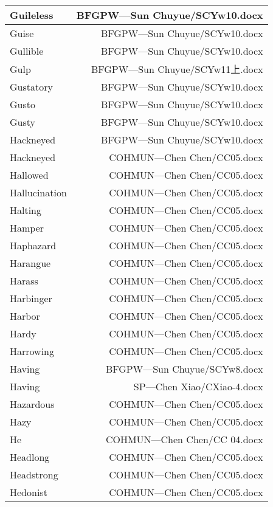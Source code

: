 \documentclass{article}
\begin{document}
\begin{center}
\begin{longtable}{|l|r|}
\hline
Guileless  &  BFGPW---Sun Chuyue/SCYw10.docx\\  
\hline
Guise  &  BFGPW---Sun Chuyue/SCYw10.docx\\  
\hline
Gullible  &  BFGPW---Sun Chuyue/SCYw10.docx\\  
\hline
Gulp  &  BFGPW---Sun Chuyue/SCYw11上.docx\\  
\hline
Gustatory  &  BFGPW---Sun Chuyue/SCYw10.docx\\  
\hline
Gusto  &  BFGPW---Sun Chuyue/SCYw10.docx\\  
\hline
Gusty  &  BFGPW---Sun Chuyue/SCYw10.docx\\  
\hline
Hackneyed  &  BFGPW---Sun Chuyue/SCYw10.docx\\  
\hline
Hackneyed  &  COHMUN---Chen Chen/CC05.docx\\  
\hline
Hallowed  &  COHMUN---Chen Chen/CC05.docx\\  
\hline
Hallucination  &  COHMUN---Chen Chen/CC05.docx\\  
\hline
Halting  &  COHMUN---Chen Chen/CC05.docx\\  
\hline
Hamper  &  COHMUN---Chen Chen/CC05.docx\\  
\hline
Haphazard  &  COHMUN---Chen Chen/CC05.docx\\  
\hline
Harangue  &  COHMUN---Chen Chen/CC05.docx\\  
\hline
Harass  &  COHMUN---Chen Chen/CC05.docx\\  
\hline
Harbinger  &  COHMUN---Chen Chen/CC05.docx\\  
\hline
Harbor  &  COHMUN---Chen Chen/CC05.docx\\  
\hline
Hardy  &  COHMUN---Chen Chen/CC05.docx\\  
\hline
Harrowing  &  COHMUN---Chen Chen/CC05.docx\\  
\hline
Having  &  BFGPW---Sun Chuyue/SCYw8.docx\\  
\hline
Having  &  SP---Chen Xiao/CXiao-4.docx\\  
\hline
Hazardous  &  COHMUN---Chen Chen/CC05.docx\\  
\hline
Hazy  &  COHMUN---Chen Chen/CC05.docx\\  
\hline
He  &  COHMUN---Chen Chen/CC 04.docx\\  
\hline
Headlong  &  COHMUN---Chen Chen/CC05.docx\\  
\hline
Headstrong  &  COHMUN---Chen Chen/CC05.docx\\  
\hline
Hedonist  &  COHMUN---Chen Chen/CC05.docx\\  

\end{longtable}
\end{center}
\end{document}
